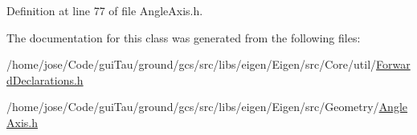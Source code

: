 Definition at line 77 of file Angle\-Axis.\-h.



The documentation for this class was generated from the following files\-:\begin{DoxyCompactItemize}
\item 
/home/jose/\-Code/gui\-Tau/ground/gcs/src/libs/eigen/\-Eigen/src/\-Core/util/\hyperlink{_forward_declarations_8h}{Forward\-Declarations.\-h}\item 
/home/jose/\-Code/gui\-Tau/ground/gcs/src/libs/eigen/\-Eigen/src/\-Geometry/\hyperlink{_angle_axis_8h}{Angle\-Axis.\-h}\end{DoxyCompactItemize}
